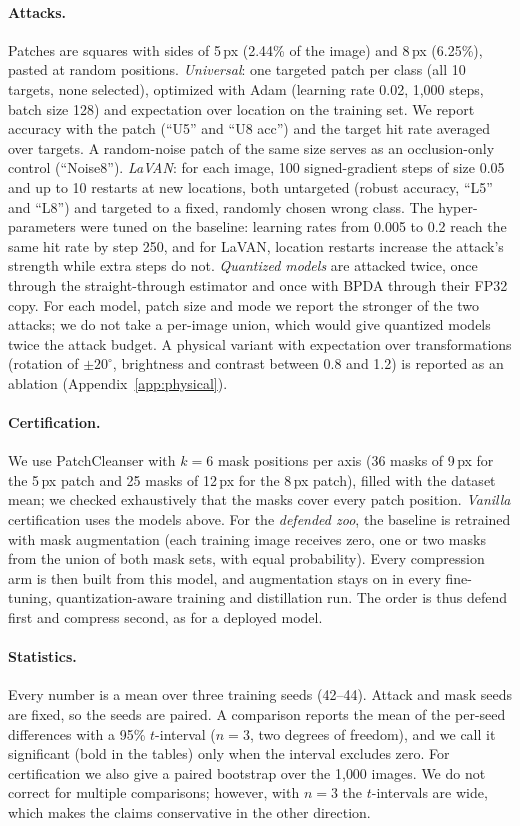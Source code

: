 \documentclass[10pt]{article}
\begin{document}
\paragraph{Attacks.} Patches are squares with sides of 5\,px (2.44\% of the image) and 8\,px (6.25\%), pasted at random
positions. \emph{Universal}: one targeted patch per class (all 10 targets, none selected), optimized with Adam (learning rate
0.02, 1{,}000 steps, batch size 128) and expectation over location on the training set. We report accuracy with the patch
(``U5'' and ``U8 acc'') and the target hit rate averaged over targets. A random-noise patch of the same size serves as an
occlusion-only control (``Noise8'').
\emph{LaVAN}: for each image, 100 signed-gradient steps of size 0.05 and up to 10 restarts at new locations, both untargeted
(robust accuracy, ``L5'' and ``L8'') and targeted to a fixed, randomly chosen wrong class. The hyper-parameters were tuned on
the baseline: learning rates from 0.005 to 0.2 reach the same hit rate by step 250, and for LaVAN, location restarts
increase the attack's strength while extra steps do not.
\emph{Quantized models} are attacked twice, once through the straight-through estimator and once with BPDA through their
FP32 copy. For each model, patch size and mode we report the stronger of the two attacks; we do not take a per-image union,
which would give quantized models twice the attack budget. A physical variant with expectation over transformations
(rotation of $\pm 20^\circ$, brightness and contrast between 0.8 and 1.2) is reported as an ablation
(Appendix~\ref{app:physical}).

\paragraph{Certification.} We use PatchCleanser with $k=6$ mask positions per axis (36 masks of 9\,px for the 5\,px patch
and 25 masks of 12\,px for the 8\,px patch), filled with the dataset mean; we checked exhaustively that the masks cover
every patch position. \emph{Vanilla} certification uses the models above. For the \emph{defended zoo}, the baseline is
retrained with mask augmentation (each training image receives zero, one or two masks from the union of both mask sets,
with equal probability). Every compression arm is then built from this model, and augmentation stays on in every
fine-tuning, quantization-aware training and distillation run. The order is thus defend first and compress second, as for
a deployed model.

\paragraph{Statistics.} Every number is a mean over three training seeds (42--44). Attack and mask seeds are fixed, so
the seeds are paired. A comparison reports the mean of the per-seed differences with a 95\% $t$-interval ($n=3$, two
degrees of freedom), and we call it significant (bold in the tables) only when the interval excludes zero. For
certification we also give a paired bootstrap over the 1{,}000 images. We do not correct for multiple comparisons;
however, with $n=3$ the $t$-intervals are wide, which makes the claims conservative in the other direction.
\end{document}
